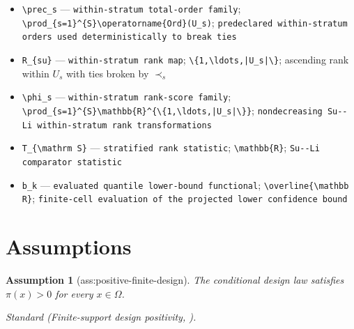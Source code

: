 \documentclass{article}
\newtheorem{assumption}{Assumption}
\begin{document}
\begin{itemize}
  \item \texttt{\textbackslash{}\allowbreak{}prec\_\allowbreak{}s} --- \texttt{within-\allowbreak{}stratum total-\allowbreak{}order family}; \texttt{\textbackslash{}\allowbreak{}prod\_\allowbreak{}\{s=\allowbreak{}1\}\allowbreak{}\textasciicircum{}\{S\}\allowbreak{}\textbackslash{}\allowbreak{}operatorname\{Ord\}\allowbreak{}(U\_\allowbreak{}s)}; \texttt{predeclared within-\allowbreak{}stratum orders used deterministically to break ties}
  \item \texttt{R\_\allowbreak{}\{su\}\allowbreak{}} --- \texttt{within-\allowbreak{}stratum rank map}; \texttt{\textbackslash{}\allowbreak{}\{1,\allowbreak{}\textbackslash{}\allowbreak{}ldots,\allowbreak{}|U\_\allowbreak{}s|\textbackslash{}\allowbreak{}\}\allowbreak{}}; ascending rank within \(U_s\) with ties broken by \(\prec_s\)
  \item \texttt{\textbackslash{}\allowbreak{}phi\_\allowbreak{}s} --- \texttt{within-\allowbreak{}stratum rank-\allowbreak{}score family}; \texttt{\textbackslash{}\allowbreak{}prod\_\allowbreak{}\{s=\allowbreak{}1\}\allowbreak{}\textasciicircum{}\{S\}\allowbreak{}\textbackslash{}\allowbreak{}mathbb\{R\}\allowbreak{}\textasciicircum{}\{\textbackslash{}\allowbreak{}\{1,\allowbreak{}\textbackslash{}\allowbreak{}ldots,\allowbreak{}|U\_\allowbreak{}s|\textbackslash{}\allowbreak{}\}\allowbreak{}\}\allowbreak{}}; \texttt{nondecreasing Su-\allowbreak{}-\allowbreak{}Li within-\allowbreak{}stratum rank transformations}
  \item \texttt{T\_\allowbreak{}\{\textbackslash{}\allowbreak{}mathrm S\}\allowbreak{}} --- \texttt{stratified rank statistic}; \texttt{\textbackslash{}\allowbreak{}mathbb\{R\}\allowbreak{}}; \texttt{Su-\allowbreak{}-\allowbreak{}Li comparator statistic}
  \item \texttt{b\_\allowbreak{}k} --- \texttt{evaluated quantile lower-\allowbreak{}bound functional}; \texttt{\textbackslash{}\allowbreak{}overline\{\textbackslash{}\allowbreak{}mathbb R\}\allowbreak{}}; \texttt{finite-\allowbreak{}cell evaluation of the projected lower confidence bound}
\end{itemize}

\section{Assumptions}

\begin{assumption}[ass:positive-finite-design]\label{ass:positive-finite-design}
The conditional design law satisfies \(\pi(x)>0\) for every \(x\in\Omega\).
\par\smallskip\noindent\emph{Standard} (Finite-support design positivity, \cite{ZhangZhao2023Randomization}).
\end{assumption}
\end{document}
